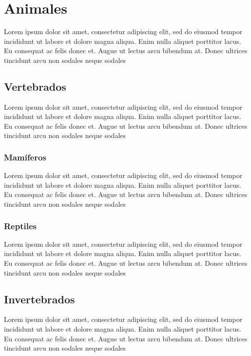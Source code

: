 \documentclass[a4]{book}
\begin{document}
	
	\chapter{Animales}
	Lorem ipsum dolor sit amet, consectetur adipiscing elit, sed do eiusmod tempor incididunt ut labore et dolore magna aliqua. Enim nulla aliquet porttitor lacus. Eu consequat ac felis donec et. Augue ut lectus arcu bibendum at. Donec ultrices tincidunt arcu non sodales neque sodales
	
	\section{Vertebrados}
	Lorem ipsum dolor sit amet, consectetur adipiscing elit, sed do eiusmod tempor incididunt ut labore et dolore magna aliqua. Enim nulla aliquet porttitor lacus. Eu consequat ac felis donec et. Augue ut lectus arcu bibendum at. Donec ultrices tincidunt arcu non sodales neque sodales
	
	\subsection{Mamíferos}
	Lorem ipsum dolor sit amet, consectetur adipiscing elit, sed do eiusmod tempor incididunt ut labore et dolore magna aliqua. Enim nulla aliquet porttitor lacus. Eu consequat ac felis donec et. Augue ut lectus arcu bibendum at. Donec ultrices tincidunt arcu non sodales neque sodales
	
	\subsection{Reptiles}
	Lorem ipsum dolor sit amet, consectetur adipiscing elit, sed do eiusmod tempor incididunt ut labore et dolore magna aliqua. Enim nulla aliquet porttitor lacus. Eu consequat ac felis donec et. Augue ut lectus arcu bibendum at. Donec ultrices tincidunt arcu non sodales neque sodales
	
	
	\section{Invertebrados}
	Lorem ipsum dolor sit amet, consectetur adipiscing elit, sed do eiusmod tempor incididunt ut labore et dolore magna aliqua. Enim nulla aliquet porttitor lacus. Eu consequat ac felis donec et. Augue ut lectus arcu bibendum at. Donec ultrices tincidunt arcu non sodales neque sodales
	
\end{document}
